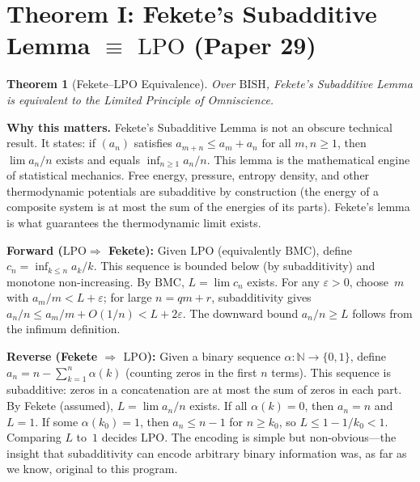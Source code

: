 \documentclass[11pt,a4paper]{report}
\theoremstyle{plain}
\newtheorem{theorem}{Theorem}[chapter]
\theoremstyle{definition}
\theoremstyle{remark}
\newcommand{\BISH}{\mathrm{BISH}}
\newcommand{\LPO}{\mathrm{LPO}}
\newcommand{\BMC}{\mathrm{BMC}}
\newcommand{\NN}{\mathbb{N}}
\begin{document}
\section{Theorem I: Fekete's Subadditive Lemma $\equiv$ $\LPO$ (Paper 29)}

\begin{theorem}[Fekete--LPO Equivalence]
Over $\BISH$, Fekete's Subadditive Lemma is equivalent to the Limited Principle of Omniscience.
\end{theorem}

\textbf{Why this matters.} Fekete's Subadditive Lemma is not an obscure technical result. It states: if $(a_n)$ satisfies $a_{m+n} \le a_m + a_n$ for all $m,n \ge 1$, then $\lim a_n/n$ exists and equals $\inf_{n\ge 1} a_n/n$. This lemma is the mathematical engine of statistical mechanics. Free energy, pressure, entropy density, and other thermodynamic potentials are subadditive by construction (the energy of a composite system is at most the sum of the energies of its parts). Fekete's lemma is what guarantees the thermodynamic limit exists.

\textbf{Forward ($\LPO \Rightarrow$ Fekete):} Given $\LPO$ (equivalently $\BMC$), define $c_n = \inf_{k \le n} a_k/k$. This sequence is bounded below (by subadditivity) and monotone non-increasing. By $\BMC$, $L = \lim c_n$ exists. For any $\varepsilon > 0$, choose~$m$ with $a_m/m < L + \varepsilon$; for large $n = qm + r$, subadditivity gives $a_n/n \le a_m/m + O(1/n) < L + 2\varepsilon$. The downward bound $a_n/n \ge L$ follows from the infimum definition.

\textbf{Reverse (Fekete $\Rightarrow$ $\LPO$):} Given a binary sequence $\alpha : \NN \to \{0,1\}$, define $a_n = n - \sum_{k=1}^n \alpha(k)$ (counting zeros in the first $n$ terms). This sequence is subadditive: zeros in a concatenation are at most the sum of zeros in each part. By Fekete (assumed), $L = \lim a_n/n$ exists. If all $\alpha(k)=0$, then $a_n = n$ and $L=1$. If some $\alpha(k_0)=1$, then $a_n \le n-1$ for $n \ge k_0$, so $L \le 1 - 1/k_0 < 1$. Comparing $L$ to~$1$ decides $\LPO$. The encoding is simple but non-obvious---the insight that subadditivity can encode arbitrary binary information was, as far as we know, original to this program.
\end{document}
